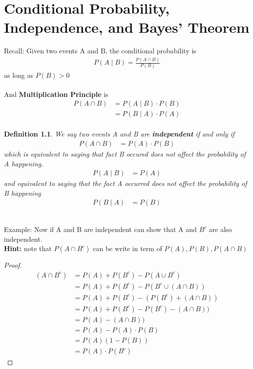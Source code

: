 \documentclass[11pt,oneside]{book}
\theoremstyle{break}
\theoremstyle{break}
\newtheorem{defn}{Definition}[corL]
\newcommand{\example}{\color{WildStrawberry}Example: \color{black}}
\begin{document}
\chapter[Conditional Probability, Independence, and Bayes' Theorem]{ \color{WildStrawberry} Conditional Probability, Independence, and Bayes' Theorem \color{Black}}
Recall: Given two events A and B, the conditional probability is \begin{align*}
P(A\mid B)=\frac{P(A\cap B)}{P(B)}
\end{align*}
as long as $P(B)>0$\\
\hfill\\
And \textbf{Multiplication Principle} is \begin{align*}
P(A\cap B)&=P(A\mid B)\cdot P(B)\\
&=P(B\mid A)\cdot P(A)\\
\end{align*}
\begin{defn}
We say two events A and B are \textbf{independent} if and only if \begin{align*}
P(A\cap B)&=P(A)\cdot P(B)
\end{align*}
which is equivalent to saying that fact B occured does not affect the probability of A happening.\begin{align*}
P(A\mid B)&=P(A)
\end{align*}
and equivalent to saying that the fact A occurred does not affect the probability of B happening\begin{align*}
P(B\mid A)&=P(B)
\end{align*}
\end{defn}
\hfill\\
\example 
Now if A and B are independent can show that A and $B^c$ are also independent.\\
\textbf{Hint:} note that $P(A\cap B^c)$ can be write in term of $P(A),P(B),P(A\cap B)$
\begin{proof}
\begin{align*}
(A\cap B^c)&=P(A)+P(B^c)-P(A\cup B^c)\\
&=P(A)+P(B^c)-P(B^c\cup (A\cap B))\\
&=P(A)+P(B^c)-(P(B^c)+ (A\cap B))\\
&=P(A)+P(B^c)-P(B^c)- (A\cap B))\\
&=P(A)-(A\cap B))\\
&=P(A)-P(A)\cdot P(B)\\
&=P(A)(1-P(B))\\
&=P(A)\cdot P(B^c)
\end{align*}
\end{proof}
\end{document}
